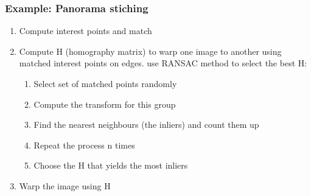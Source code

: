 \documentclass[]{article}
\begin{document}
	\subsubsection{Example: Panorama stiching} 
	\begin{enumerate}
		\item Compute interest points and match
		\item Compute H (homography matrix) to warp one image to another using matched interest points on edges. use RANSAC method to select the best H:
		\begin{enumerate}
			\item Select set of matched points randomly
			\item Compute the transform for this group
			\item Find the nearest neighbours (the inliers) and count them up
			\item Repeat the process n times
			\item Choose the H that yields the most inliers
		\end{enumerate}
		\item Warp the image using H
	\end{enumerate}
\end{document}
